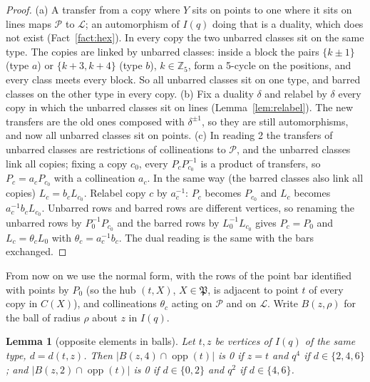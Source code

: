\documentclass[11pt]{amsart}
\newtheorem{lemma}[theorem]{Lemma}
\theoremstyle{definition}
\theoremstyle{remark}
\numberwithin{equation}{section}
\newcommand{\Z}{\mathbb Z}
\newcommand{\opp}{\operatorname{opp}}
\newcommand{\cL}{\mathcal L}
\newcommand{\cP}{\mathcal P}
\begin{document}
\begin{proof}
(a) A transfer from a copy where $Y$ sits on points to one where it sits on lines maps $\cP$ to $\cL$; an automorphism of
$I(q)$ doing that is a duality, which does not exist (Fact~\ref{fact:hex}). In every copy the two unbarred classes sit on the
same type. The copies are linked by unbarred classes: inside a block the pairs $\{k\pm1\}$ (type $a$) or $\{k+3,k+4\}$ (type
$b$), $k\in\Z_5$, form a 5-cycle on the positions, and every class meets every block. So all unbarred classes sit on one
type, and barred classes on the other type in every copy.
(b) Fix a duality $\delta$ and relabel by $\delta$ every copy in which the unbarred classes sit on lines
(Lemma~\ref{lem:relabel}). The new transfers are the old ones composed with $\delta^{\pm1}$, so they are still automorphisms,
and now all unbarred classes sit on points.
(c) In reading 2 the transfers of unbarred classes are restrictions of collineations to $\cP$, and the unbarred classes link
all copies; fixing a copy $c_0$, every $P_cP_{c_0}^{-1}$ is a product of transfers, so $P_c=a_cP_{c_0}$ with a collineation
$a_c$. In the same way (the barred classes also link all copies) $L_c=b_cL_{c_0}$. Relabel copy $c$ by $a_c^{-1}$: $P_c$
becomes $P_{c_0}$ and $L_c$ becomes $a_c^{-1}b_cL_{c_0}$. Unbarred rows and barred rows are different vertices, so renaming
the unbarred rows by $P_0^{-1}P_{c_0}$ and the barred rows by $L_0^{-1}L_{c_0}$ gives $P_c=P_0$ and $L_c=\theta_cL_0$ with
$\theta_c=a_c^{-1}b_c$. The dual reading is the same with the bars exchanged.
\end{proof}

From now on we use the normal form, with the rows of the point bar identified with points by $P_0$ (so the hub $(t,X)$,
$X\in\mathfrak P$, is adjacent to point $t$ of every copy in $C(X)$), and collineations $\theta_c$ acting on $\cP$ and on
$\cL$. Write $B(z,\rho)$ for the ball of radius $\rho$ about $z$ in $I(q)$.

\begin{lemma}[opposite elements in balls]\label{lem:balls}
Let $t,z$ be vertices of $I(q)$ of the same type, $d=d(t,z)$. Then $|B(z,4)\cap\opp(t)|$ is 0 if $z=t$ and $q^4$ if
$d\in\{2,4,6\}$; and $|B(z,2)\cap\opp(t)|$ is 0 if $d\in\{0,2\}$ and $q^2$ if $d\in\{4,6\}$.
\end{lemma}
\end{document}
